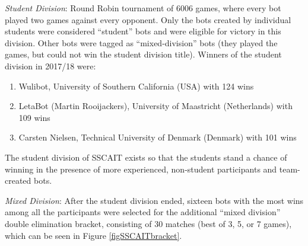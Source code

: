 \emph{Student Division}: Round Robin tournament of 6006 games, where every bot played two games against every opponent. Only the bots created by individual students were considered ``student'' bots and were eligible for victory in this division. Other bots were tagged as ``mixed-division'' bots (they played the games, but could not win the student division title). Winners of the student division in 2017/18 were:
  \begin{enumerate}
	\item Wulibot, University of Southern California (USA) with 124 wins
	\item LetaBot (Martin Rooijackers), University of Maastricht (Netherlands) with 109 wins
	\item Carsten Nielsen, Technical University of Denmark (Denmark) with 101 wins
  \end{enumerate}
The student division of SSCAIT exists so that the students stand a chance of winning in the presence of more experienced, non-student participants and team-created bots.

\emph{Mixed Division}: After the student division ended, sixteen bots with the most wins among all the participants were selected for the additional “mixed division” double elimination bracket, consisting of 30 matches (best of 3, 5, or 7 games), which can be seen in Figure \ref{figSSCAITbracket}. 

